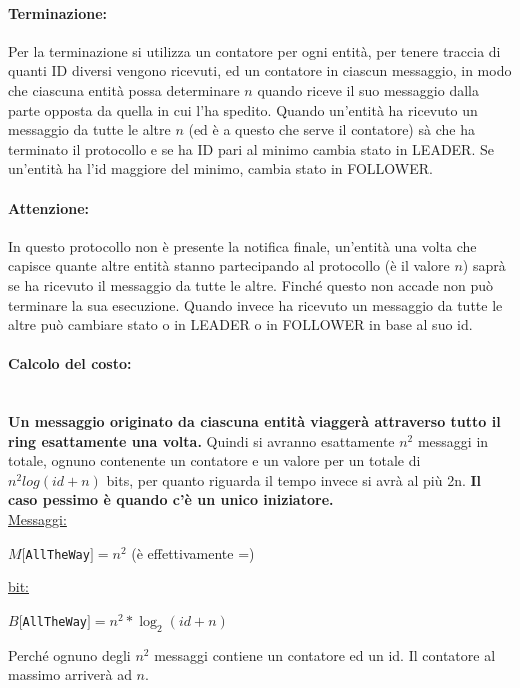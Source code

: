\paragraph{Terminazione:} Per la terminazione si utilizza un contatore per ogni
entità, per tenere traccia di quanti ID diversi vengono ricevuti, ed un
contatore in ciascun messaggio, in modo che ciascuna entità possa determinare
$n$ quando riceve il suo messaggio dalla parte opposta da quella in cui l'ha
spedito. Quando un'entità ha ricevuto un messaggio da tutte le altre $n$ (ed è a
questo che serve il contatore) sà che ha terminato il protocollo e se ha ID pari
al minimo cambia stato in LEADER. Se un'entità ha l'id maggiore del minimo,
cambia stato in FOLLOWER.

\paragraph{Attenzione:} In questo protocollo non è presente la notifica finale,
un'entità una volta che capisce quante altre entità stanno partecipando al
protocollo (è il valore $n$) saprà se ha ricevuto il messaggio da tutte le
altre. Finché questo non accade non può terminare la sua esecuzione. Quando
invece ha ricevuto un messaggio da tutte le altre può cambiare stato o in LEADER
o in FOLLOWER in base al suo id.

\paragraph{Calcolo del costo:}\ \\
\textbf{Un messaggio originato da ciascuna entità
    viaggerà attraverso tutto il ring esattamente una volta.} Quindi si avranno
esattamente $n^2$ messaggi in totale, ognuno contenente un contatore e un valore
per un totale di $n^2log(id+n)$ bits, per quanto riguarda il tempo invece si
avrà al più 2n. \textbf{Il caso pessimo è quando c'è un unico iniziatore.}\\
\underline{Messaggi:}
\begin{center}
    $M[$\texttt{AllTheWay}$] = n^2$ (è effettivamente =)
\end{center}
\underline{bit:}
\begin{center}
    $B[$\texttt{AllTheWay}$] = n^2*\log_2(id+n)$
\end{center}

Perché ognuno degli $n^2$ messaggi contiene un contatore ed un id. Il contatore
al massimo arriverà ad $n$.


